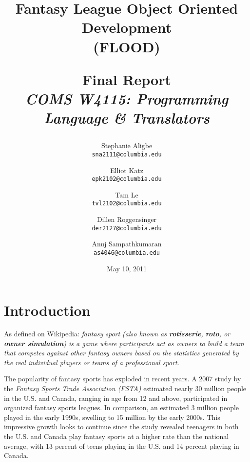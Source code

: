 \documentclass[12pt]{report}
\begin{document}
\title{
\textbf{Fantasy League Object Oriented Development}\\
\textbf{(FLOOD)}\\
\begin{doublespace}
\end{doublespace}
\LARGE{Final Report}\\
{\normalsize \textit{COMS W4115: Programming Language \& Translators}}
}

\begin{singlespace}
\author{
  Stephanie Aligbe\\
  \texttt{\small{sna2111@columbia.edu}}
  \and
  Elliot Katz\\
  \texttt{\small{epk2102@columbia.edu}}
  \and
  Tam Le\\
  \texttt{\small{tvl2102@columbia.edu}}
  \and
  Dillen Roggensinger\\
  \texttt{\small{der2127@columbia.edu}}
  \and
  Anuj Sampathkumaran\\
  \texttt{\small{as4046@columbia.edu}}
}
\end{singlespace}

\date{May 10, 2011}

\maketitle

\doublespacing

\tableofcontents

\chapter{Introduction}

As defined on Wikipedia: \textit{fantasy sport (also known as \textbf{rotisserie}, \textbf{roto}, or \textbf{owner simulation}) is a game where participants act as owners to build a team that competes against other fantasy owners based on the statistics generated by the real individual players or teams of a professional sport.}

The popularity of fantasy sports has exploded in recent years. A 2007 study by the \textit{Fantasy Sports Trade Association (FSTA)} estimated  nearly 30 million people in the U.S. and Canada, ranging in age from 12 and above, participated in organized fantasy sports leagues. In comparison, an estimated 3 million people played in the early 1990s, swelling to 15 million by the early 2000s. This impressive growth looks to continue since the study revealed teenagers in both the U.S. and Canada play fantasy sports at a higher rate than the national average, with 13 percent of teens playing in the U.S. and 14 percent playing in Canada.
\end{document}
